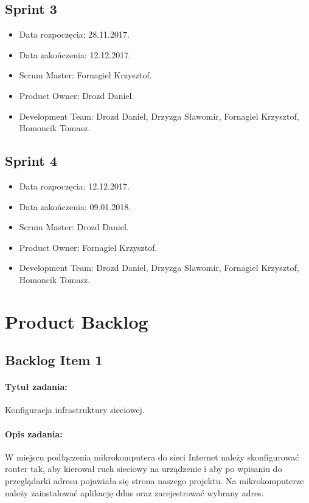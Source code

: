 	\subsection{Sprint 3}
	\begin{itemize}
		\item Data rozpoczęcia: 28.11.2017.
		\item Data zakończenia: 12.12.2017.
		\item Scrum Master: Fornagiel Krzysztof.
		\item Product Owner: Drozd Daniel.
		\item Development Team: Drozd Daniel, Drzyzga Sławomir, Fornagiel Krzysztof, Homoncik Tomasz.
	\end{itemize}
	
	\subsection{Sprint 4}
	\begin{itemize}
		\item Data rozpoczęcia: 12.12.2017.
		\item Data zakończenia: 09.01.2018.
		\item Scrum Master: Drozd Daniel.
		\item Product Owner: Fornagiel Krzysztof.
		\item Development Team: Drozd Daniel, Drzyzga Sławomir, Fornagiel Krzysztof, Homoncik Tomasz.
	\end{itemize}
	
\section{Product Backlog}
	\subsection{Backlog Item 1}
	\paragraph{Tytuł zadania:}
	Konfiguracja infrastruktury sieciowej.
	
	\paragraph{Opis zadania:}
	W miejscu podłączenia mikrokomputera do sieci Internet należy skonfigurować router tak, aby kierował ruch sieciowy na urządzenie i aby po wpisaniu do przeglądarki adresu pojawiała się strona naszego projektu. Na mikrokomputerze należy zainstalować aplikację ddns oraz zarejestrować wybrany adres.
	
